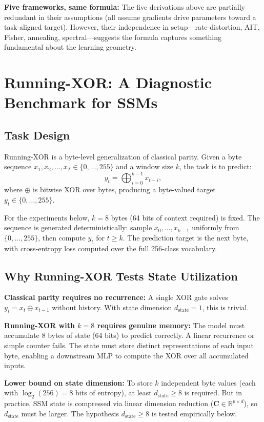 \documentclass{article}
\begin{document}
\textbf{Five frameworks, same formula:} The five derivations above are partially redundant in their assumptions (all assume gradients drive parameters toward a task-aligned target). However, their independence in setup---rate-distortion, AIT, Fisher, annealing, spectral---suggests the formula captures something fundamental about the learning geometry.

\section{Running-XOR: A Diagnostic Benchmark for SSMs}

\subsection{Task Design}

Running-XOR is a byte-level generalization of classical parity. Given a byte sequence $x_1, x_2, \ldots, x_T \in \{0, \ldots, 255\}$ and a window size $k$, the task is to predict:
\begin{equation}
  y_t = \bigoplus_{i=0}^{k-1} x_{t-i},
\end{equation}
where $\oplus$ is bitwise XOR over bytes, producing a byte-valued target $y_t \in \{0, \ldots, 255\}$.

For the experiments below, $k = 8$ bytes (64 bits of context required) is fixed. The sequence is generated deterministically: sample $x_0, \ldots, x_{k-1}$ uniformly from $\{0, \ldots, 255\}$, then compute $y_t$ for $t \geq k$. The prediction target is the next byte, with cross-entropy loss computed over the full 256-class vocabulary.

\subsection{Why Running-XOR Tests State Utilization}

\textbf{Classical parity requires no recurrence:} A single XOR gate solves $y_t = x_t \oplus x_{t-1}$ without history. With state dimension $d_{\mathrm{state}} = 1$, this is trivial.

\textbf{Running-XOR with $k = 8$ requires genuine memory:} The model must accumulate 8 bytes of state (64 bits) to predict correctly. A linear recurrence or simple counter fails. The state must store distinct representations of each input byte, enabling a downstream MLP to compute the XOR over all accumulated inputs.

\textbf{Lower bound on state dimension:} To store $k$ independent byte values (each with $\log_2(256) = 8$ bits of entropy), at least $d_{\mathrm{state}} \geq 8$ is required. But in practice, SSM state is compressed via linear dimension reduction ($\mathbf{C} \in \mathbb{R}^{p \times d}$), so $d_{\mathrm{state}}$ must be larger. The hypothesis $d_{\mathrm{state}} \geq 8$ is tested empirically below.
\end{document}
